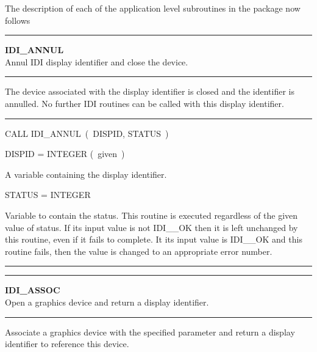 The description of each of the application level subroutines in the package
now follows

\vspace{10mm}
\parbox{160mm}{

\rule{160mm}{0.5mm}

\hspace*{10mm}\parbox{140mm}{
{\bf IDI\_ANNUL\label{IDI_ANNUL}} \\
Annul IDI display identifier and close the device.}

\rule{160mm}{0.1mm}

\hspace*{10mm}\parbox{140mm}{
The device associated with the display identifier is closed and the
identifier is annulled. No further IDI routines can be called with this
display identifier.}

\rule{160mm}{0.1mm}

\hspace*{10mm}\parbox{140mm}{
CALL IDI\_ANNUL~(~DISPID, STATUS~)}

\hspace*{10mm}\parbox{140mm}{
DISPID = INTEGER \hspace{10mm} (~given~)}

\hspace*{30mm}\parbox{120mm}{
A variable containing the display identifier.}

\hspace*{10mm}\parbox{140mm}{
STATUS = INTEGER}

\hspace*{30mm}\parbox{120mm}{
Variable to contain the status. This routine is executed regardless of the
given value of status. If its input value is not IDI\_\_OK then it is left
unchanged by this routine, even if it fails to complete. It its input value
is IDI\_\_OK and this routine fails, then the value is changed to an
appropriate error number.}

\rule{160mm}{0.5mm}


\rule{160mm}{0.5mm}

\hspace*{10mm}\parbox{140mm}{
{\bf IDI\_ASSOC\label{IDI_ASSOC}} \\
Open a graphics device and return a display identifier.}

\rule{160mm}{0.1mm}

\hspace*{10mm}\parbox{140mm}{
Associate a graphics device with the specified parameter and return a
display identifier to reference this device.}

}

